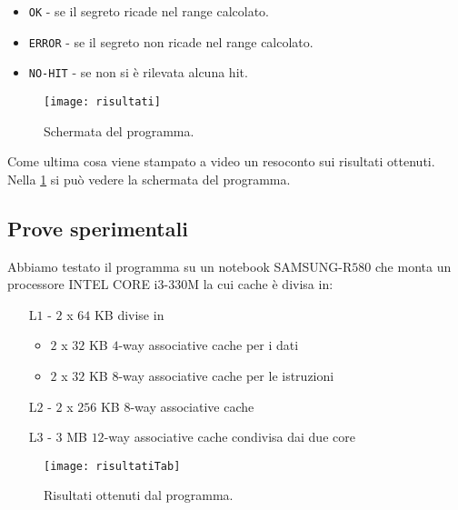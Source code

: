 				\begin{itemize}
					\item \texttt{OK} - se il segreto ricade nel range calcolato.
					\item \texttt{ERROR} - se il segreto non ricade nel range calcolato.
					\item \texttt{NO-HIT} - se non si è rilevata alcuna hit.
				\end{itemize}
			
				\begin{figure}
					\begin{center}
						\texttt{[image: risultati]}
						\caption[Schermata di SPARK]{Schermata del programma.}
						\label{fig:schermata}
					\end{center}
				\end{figure}
				
				Come ultima cosa viene stampato a video un resoconto sui risultati ottenuti. Nella \cref{fig:schermata} si può vedere la schermata del programma.
			
			\subsection{Prove sperimentali}
				Abbiamo testato il programma su un notebook SAMSUNG-R$580$ che monta un processore INTEL CORE i$3$-$330$M la cui cache è divisa in:
				\begin{itemize}
					\item [L$1$ -] $2$ x $64$ KB divise in 
					\begin{itemize}
						\item  $2$ x $32$ KB $4$-way associative cache per i dati
						\item  $2$ x $32$ KB $8$-way associative cache per le istruzioni
					\end{itemize}
					\item[L$2$ -] $2$ x $256$ KB $8$-way associative cache
					\item[L$3$ -] $3$ MB $12$-way associative cache condivisa dai due core
				\end{itemize}
			
				\begin{figure}
					\begin{center}
						\texttt{[image: risultatiTab]}
						\caption[Risultati SPARK]{Risultati ottenuti dal programma.}
						\label{fig:risultati}
					\end{center}
				\end{figure}
			
